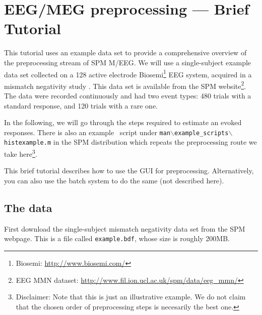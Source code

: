 \chapter{EEG/MEG preprocessing --- Brief Tutorial \label{Chap:eeg:tutorial}}

This tutorial uses an example data set to provide a comprehensive overview of the preprocessing stream of SPM M/EEG. We will use a single-subject example data set collected on a 128 active electrode Biosemi\footnote{Biosemi: \url{http://www.biosemi.com/}} EEG system, acquired in a mismatch negativity study \cite{mg_dcm_repro}. This data set is available from the SPM website\footnote{EEG MMN dataset: \url{http://www.fil.ion.ucl.ac.uk/spm/data/eeg\_mmn/}}. The data were recorded continuously and had two event types: 480 trials with a standard response, and 120 trials with a rare one.

In the following, we will go through the steps required to estimate an evoked responses. There is also an example \matlab\ script under \texttt{man$\backslash$example\_scripts$\backslash$histexample.m} in the SPM distribution which repeats the preprocessing route we take here\footnote{Disclaimer: Note that this is just an illustrative example. We do not claim that the chosen order of preprocessing steps is necesarily the best one.}.

This brief tutorial describes how to use the GUI for preprocessing. Alternatively, you can also use the batch system to do the same (not described here).

\section{The data}
First download the single-subject mismatch negativity data set from the SPM webpage\footnotemark[2]. This is a file called \texttt{example.bdf}, whose size is roughly 200MB.

